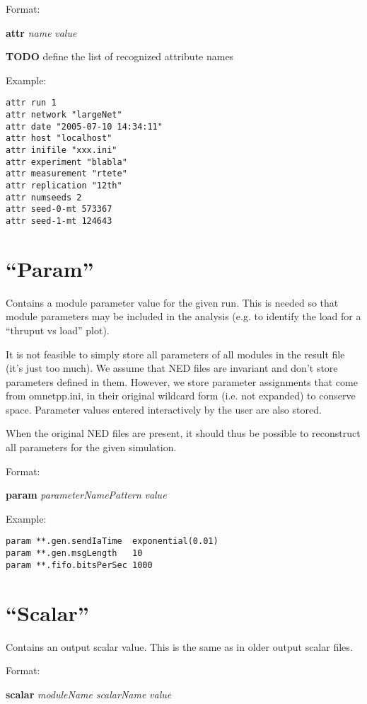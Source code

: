 Format:

\textbf{attr} \textit{name} \textit{value}

\textbf{TODO} define the list of recognized attribute names

Example:

\begin{verbatim}
attr run 1
attr network "largeNet"
attr date "2005-07-10 14:34:11"
attr host "localhost"
attr inifile "xxx.ini"
attr experiment "blabla"
attr measurement "rtete"
attr replication "12th"
attr numseeds 2
attr seed-0-mt 573367
attr seed-1-mt 124643
\end{verbatim}

\section{``Param''}

Contains a module parameter value for the given run. This is needed so
that module parameters may be included in the analysis (e.g. to
identify the load for a ``thruput vs load'' plot).

It is not feasible to simply store all parameters of all modules in the
result file (it's just too much). We assume that NED files are
invariant and don't store parameters defined in them. However, we store
parameter assignments that come from omnetpp.ini, in their original
wildcard form (i.e. not expanded) to conserve space. Parameter values
entered interactively by the user are also stored.

When the original NED files are present, it should thus be possible to
reconstruct all parameters for the given simulation.

Format:

\textbf{param} \textit{parameterNamePattern} \textit{value}

Example:

\begin{verbatim}
param **.gen.sendIaTime  exponential(0.01)
param **.gen.msgLength   10
param **.fifo.bitsPerSec 1000
\end{verbatim}


\section{``Scalar''}

Contains an output scalar value. This is the same as in older output
scalar files.

Format:

\textbf{scalar} \textit{moduleName} \textit{scalarName} \textit{value}

